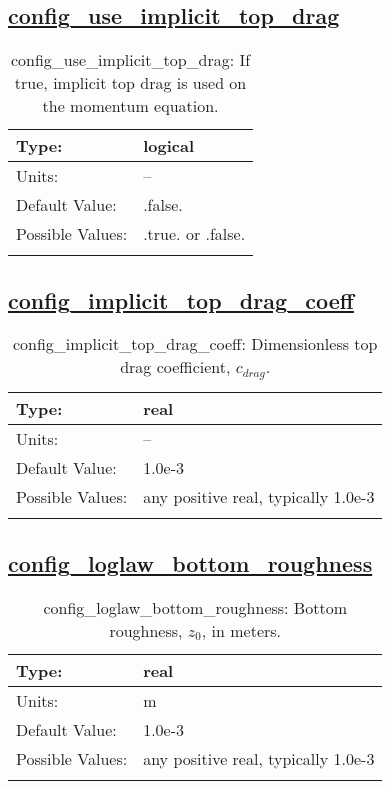 \subsection[config\_use\_implicit\_top\_drag]{\hyperref[sec:nm_tab_bottom_drag]{config\_use\_implicit\_top\_drag}}
\label{subsec:nm_sec_config_use_implicit_top_drag}
\begin{center}
\begin{longtable}{| p{2.0in} || p{4.0in} |}
    \hline
    Type: & logical \\
    \hline
    Units: & -- \\
    \hline
    Default Value: & .false. \\
    \hline
    Possible Values: & .true. or .false. \\
    \hline
    \caption{config\_use\_implicit\_top\_drag: If true, implicit top drag is used on the momentum equation.}
\end{longtable}
\end{center}
\subsection[config\_implicit\_top\_drag\_coeff]{\hyperref[sec:nm_tab_bottom_drag]{config\_implicit\_top\_drag\_coeff}}
\label{subsec:nm_sec_config_implicit_top_drag_coeff}
\begin{center}
\begin{longtable}{| p{2.0in} || p{4.0in} |}
    \hline
    Type: & real \\
    \hline
    Units: & -- \\
    \hline
    Default Value: & 1.0e-3 \\
    \hline
    Possible Values: & any positive real, typically 1.0e-3 \\
    \hline
    \caption{config\_implicit\_top\_drag\_coeff: Dimensionless top drag coefficient, $c_{drag}$.}
\end{longtable}
\end{center}
\subsection[config\_loglaw\_bottom\_roughness]{\hyperref[sec:nm_tab_bottom_drag]{config\_loglaw\_bottom\_roughness}}
\label{subsec:nm_sec_config_loglaw_bottom_roughness}
\begin{center}
\begin{longtable}{| p{2.0in} || p{4.0in} |}
    \hline
    Type: & real \\
    \hline
    Units: & \si{m} \\
    \hline
    Default Value: & 1.0e-3 \\
    \hline
    Possible Values: & any positive real, typically 1.0e-3 \\
    \hline
    \caption{config\_loglaw\_bottom\_roughness: Bottom roughness, $z_0$, in meters.}
\end{longtable}
\end{center}
